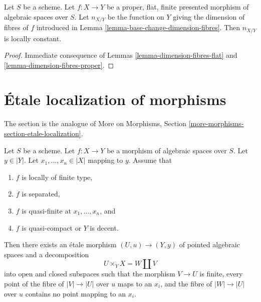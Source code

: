 \begin{lemma}
\label{lemma-dimension-fibres-proper-flat}
Let $S$ be a scheme. Let $f : X \to Y$ be a proper, flat, finite presented
morphism of algebraic spaces over $S$.
Let $n_{X/Y}$ be the function on $Y$ giving the dimension of fibres of $f$
introduced in Lemma \ref{lemma-base-change-dimension-fibres}.
Then $n_{X/Y}$ is locally constant.
\end{lemma}

\begin{proof}
Immediate consequence of
Lemmas \ref{lemma-dimension-fibres-flat} and
\ref{lemma-dimension-fibres-proper}.
\end{proof}









\section{\'Etale localization of morphisms}
\label{section-etale-localization}

\noindent
The section is the analogue of
More on Morphisms, Section \ref{more-morphisms-section-etale-localization}.

\begin{lemma}
\label{lemma-etale-splits-off-quasi-finite-part}
Let $S$ be a scheme.
Let $f : X \to Y$ be a morphism of algebraic spaces over $S$.
Let $y \in |Y|$. Let $x_1, \ldots, x_n \in |X|$ mapping to $y$.
Assume that
\begin{enumerate}
\item $f$ is locally of finite type,
\item $f$ is separated,
\item $f$ is quasi-finite at $x_1, \ldots, x_n$, and
\item $f$ is quasi-compact or $Y$ is decent.
\end{enumerate}
Then there exists an \'etale morphism $(U, u) \to (Y, y)$
of pointed algebraic spaces and a decomposition
$$
U \times_Y X = W \amalg V
$$
into open and closed subspaces such that the morphism $V \to U$ is finite,
every point of the fibre of $|V| \to |U|$ over $u$ maps to an $x_i$,
and the fibre of $|W| \to |U|$ over $u$ contains no point mapping to an
$x_i$.
\end{lemma}

